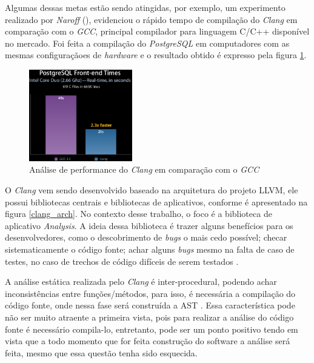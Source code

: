 Algumas dessas metas estão sendo atingidas, por exemplo, um experimento
realizado por \emph{Naroff} (\citeyear{naroff2009}), evidenciou o rápido
tempo de compilação do \emph{Clang} em comparação com o \emph{GCC}, principal
compilador para linguagem C/C++ disponível no mercado. Foi feita a compilação do \textit{PostgreSQL} em computadores com as
mesmas configuraçãoes de \textit{hardware} e o resultado obtido é expresso pela figura \ref{clang_gcc}.

\begin{figure}[h]
  \centering
  \includegraphics[width=0.4\textwidth]
      {figuras/clang_gcc.eps}
      \caption{Análise de performance do \emph{Clang} em comparação com o
      \emph{GCC}}
  \label{clang_gcc}
\end{figure}

O \emph{Clang} vem sendo desenvolvido baseado na arquitetura do projeto LLVM, ele possui bibliotecas centrais e bibliotecas de 
aplicativos, conforme é apresentado na figura \ref{clang_arch}. No contexto desse trabalho, o foco é a biblioteca de aplicativo
\textit{Analysis}. A ideia dessa biblioteca é trazer alguns benefícios para os desenvolvedores, como o descobrimento de 
\textit{bugs} o mais cedo possível; checar sistematicamente o código fonte; achar alguns \textit{bugs} mesmo na falta de caso
de testes, no caso de trechos de código difíceis de serem testados \cite{kremenek2009}. 

A análise estática realizada pelo \emph{Clang} é inter-procedural, podendo achar inconsistências entre funções/métodos, para isso,
é necessária a compilação do código fonte, onde nessa fase será construída a AST 
\cite{kremenek2009}. Essa característica pode não ser muito atraente a primeira vista, pois para realizar a análise do código 
fonte é necessário compila-lo, entretanto, pode ser um ponto positivo tendo em vista que a todo momento que for feita 
construção do software a análise será feita, mesmo que essa questão tenha sido esquecida.

